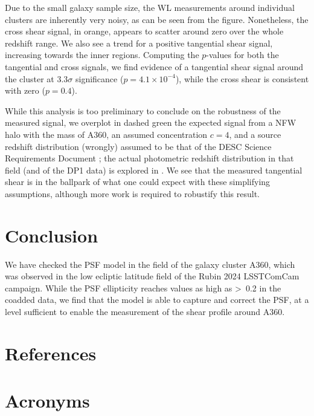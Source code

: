 \documentclass[SE,lsstdraft,authoryear,toc]{lsstdoc}
\begin{document}
Due to the small galaxy sample size, the WL measurements around individual clusters are inherently very noisy, as can be seen from the figure. Nonetheless, the cross shear signal, in orange, appears to scatter around zero over the whole redshift range. We also see a trend for a positive tangential shear signal, increasing towards the inner regions. Computing the $p$-values for both the tangential and cross signals, we find evidence of a tangential shear signal around the cluster at $3.3\sigma$ significance ($p = 4.1 \times 10^{-4}$), while the cross shear is consistent with zero ($p = 0.4$).

While this analysis is too preliminary to conclude on the robustness of the measured signal, we overplot in dashed green the expected signal from a NFW halo with the mass of A360, an assumed concentration $c=4$, and a source redshift distribution (wrongly) assumed to be that of the DESC Science Requirements Document \citep{2018arXiv180901669T}; the actual photometric redshift distribution in that field (and of the DP1 data) is explored in . We see that the measured tangential shear is in the ballpark of what one could expect with these simplifying assumptions, although more work is required to robustify this result.


\section{Conclusion}
\label{sec:conclusion}
We have checked the PSF model in the field of the galaxy cluster A360, which was observed in the low ecliptic latitude field of the Rubin 2024 LSSTComCam campaign. While the PSF ellipticity reaches values as high as >~0.2 in the coadded data, we find that the model is able to capture and correct the PSF, at a level sufficient to enable the measurement of the shear profile around A360.


\appendix
\section{References} \label{sec:bib}
\renewcommand{\refname}{} %


\section{Acronyms} \label{sec:acronyms}

\end{document}
